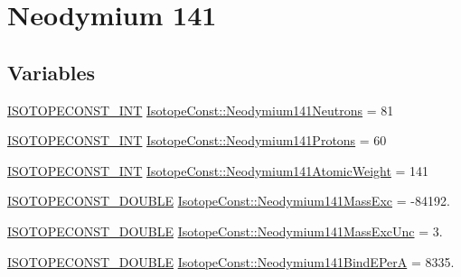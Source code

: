 \hypertarget{group___isotope_const-_neodymium-_nd141}{}\section{Neodymium 141}
\label{group___isotope_const-_neodymium-_nd141}
\subsection*{Variables}
\begin{DoxyCompactItemize}
\item 
\mbox{\hyperlink{group___isotope_const-_macros_ga5f18360b3e99483a35c32d789e62621c}{I\+S\+O\+T\+O\+P\+E\+C\+O\+N\+S\+T\+\_\+\+I\+NT}} \mbox{\hyperlink{group___isotope_const-_neodymium-_nd141_gaed7bbc92cf527a9d80ce5c18023c6402}{Isotope\+Const\+::\+Neodymium141\+Neutrons}} = 81
\item 
\mbox{\hyperlink{group___isotope_const-_macros_ga5f18360b3e99483a35c32d789e62621c}{I\+S\+O\+T\+O\+P\+E\+C\+O\+N\+S\+T\+\_\+\+I\+NT}} \mbox{\hyperlink{group___isotope_const-_neodymium-_nd141_ga33383dbf4531522916e33be9e6ab5a2a}{Isotope\+Const\+::\+Neodymium141\+Protons}} = 60
\item 
\mbox{\hyperlink{group___isotope_const-_macros_ga5f18360b3e99483a35c32d789e62621c}{I\+S\+O\+T\+O\+P\+E\+C\+O\+N\+S\+T\+\_\+\+I\+NT}} \mbox{\hyperlink{group___isotope_const-_neodymium-_nd141_ga2a490de726af02e1df717c9249edbe9c}{Isotope\+Const\+::\+Neodymium141\+Atomic\+Weight}} = 141
\item 
\mbox{\hyperlink{group___isotope_const-_macros_ga8f45a7272ce02c0b4c65c44636ed719a}{I\+S\+O\+T\+O\+P\+E\+C\+O\+N\+S\+T\+\_\+\+D\+O\+U\+B\+LE}} \mbox{\hyperlink{group___isotope_const-_neodymium-_nd141_ga03a66bb9db3aa0ce37d4469bcd5d067f}{Isotope\+Const\+::\+Neodymium141\+Mass\+Exc}} = -\/84192.
\item 
\mbox{\hyperlink{group___isotope_const-_macros_ga8f45a7272ce02c0b4c65c44636ed719a}{I\+S\+O\+T\+O\+P\+E\+C\+O\+N\+S\+T\+\_\+\+D\+O\+U\+B\+LE}} \mbox{\hyperlink{group___isotope_const-_neodymium-_nd141_ga1250486661ee41bc5ba3dc72f16a0f82}{Isotope\+Const\+::\+Neodymium141\+Mass\+Exc\+Unc}} = 3.
\item 
\mbox{\hyperlink{group___isotope_const-_macros_ga8f45a7272ce02c0b4c65c44636ed719a}{I\+S\+O\+T\+O\+P\+E\+C\+O\+N\+S\+T\+\_\+\+D\+O\+U\+B\+LE}} \mbox{\hyperlink{group___isotope_const-_neodymium-_nd141_ga07568d0a6d8049d00a1d1784c90356b9}{Isotope\+Const\+::\+Neodymium141\+Bind\+E\+PerA}} = 8335.
\item 

\end{DoxyCompactItemize}
